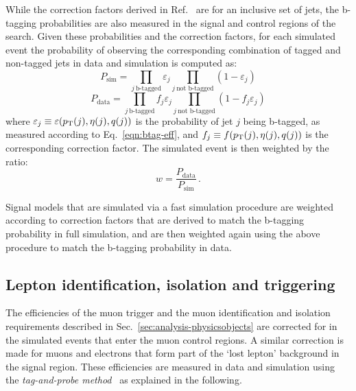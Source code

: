 While the correction factors derived in Ref.~\cite{btagging-cms-run2} are for 
an inclusive set of jets, the b-tagging probabilities are also measured in 
the signal and control regions of the search. Given these probabilities and the 
correction factors, for each simulated event the probability of observing the 
corresponding combination of tagged and non-tagged jets in data and simulation 
is computed as:
\begin{equation}
P_\text{sim} = \prod_{j~\text{b-tagged}} \varepsilon_{j} 
\prod_{j~\text{not 
b-tagged}} (1 - \varepsilon_{j})
\end{equation}
\begin{equation}
P_\text{data} = \prod_{j~\text{b-tagged}} f_{j} \varepsilon_{j} 
\prod_{j~\text{not 
b-tagged}} (1 - f_{j} \varepsilon_{j})
\end{equation}
where $\varepsilon_{j} \equiv \varepsilon({p_{\text T}}(j), \eta(j), q(j))$ is 
the probability of jet $j$ being b-tagged, as measured according to 
Eq.~\ref{eqn:btag-eff}, and $f_{j} \equiv f({p_{\text T}}(j), \eta(j), q(j))$ is 
the corresponding correction factor. 
The simulated event is then weighted by the ratio:
\begin{equation}
w = \frac{P_\text{data}}{P_\text{sim}} \, .
\end{equation}

Signal models that are simulated via a fast simulation procedure are weighted 
according to correction factors that are derived to match the b-tagging 
probability in full simulation, and are then weighted again using the above 
procedure to match the b-tagging probability in data.



\subsection{Lepton identification, isolation and triggering}
\label{sec:analysis-mccorrections-muonsf}
The efficiencies of the muon trigger and the muon identification and isolation 
requirements 
described in Sec.~\ref{sec:analysis-physicsobjects} are corrected for in 
the simulated events that enter the muon control regions. A similar correction 
is made for muons and electrons that form part of the `lost lepton' background 
in the signal region. These efficiencies 
are measured in data and simulation using the \textit{tag-and-probe 
method}~\cite{tagnprobe} as explained in the following.

